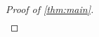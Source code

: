 \documentclass[aps,pra,reprint,superscriptaddress,floatfix,amsmath,amssymb,amsfonts]{revtex4-1}
\newcommand*{\ot}{\otimes}
\begin{document}
\begin{proof}[Proof of \cref{thm:main}]
\begin{equation}
\begin{aligned}

\end{aligned}
\end{equation}
\end{proof}
\end{document}

